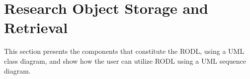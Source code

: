 \section{Research Object Storage and Retrieval}
\label{sec:rodl}

This section presents the components that constitute the RODL, using a UML class diagram, and show how the user can utilize RODL using a UML sequence diagram.